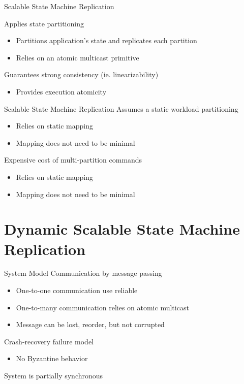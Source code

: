 \documentclass[10pt]{beamer}
\begin{document}
\begin{frame}[fragile]{Scalable State Machine Replication}

  Applies state partitioning
  \begin{itemize}
    \item Partitions application's state and replicates each partition
    \item Relies on an atomic multicast primitive %
  \end{itemize}

  Guarantees strong consistency (ie. linearizability)
  \begin{itemize}
    \item Provides execution atomicity
  \end{itemize}

  
\end{frame}

\begin{frame}[fragile]{Scalable State Machine Replication}
  Assumes a static workload partitioning
  \begin{itemize}
    \item Relies on static mapping
    \item Mapping does not need to be minimal
  \end{itemize}
  Expensive cost of multi-partition commands
  \begin{itemize}
    \item Relies on static mapping
    \item Mapping does not need to be minimal
  \end{itemize}
  
\end{frame}

\section{Dynamic Scalable State Machine Replication}

\begin{frame}{System Model}
  Communication by message passing
  \begin{itemize}
    \item One-to-one communication use reliable 
    \item One-to-many communication relies on atomic multicast
    \item Message can be lost, reorder, but not corrupted
  \end{itemize}
  Crash-recovery failure model
  \begin{itemize}
    \item No Byzantine behavior
  \end{itemize}
  System is partially synchronous
\end{frame}
\end{document}

